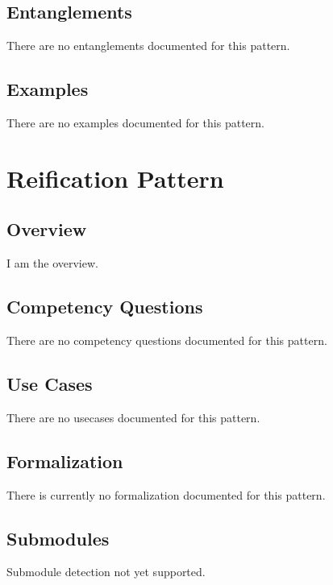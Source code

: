\subsection{Entanglements}
\label{ssec:entanglements}
There are no entanglements documented for this pattern.

\subsection{Examples}
\label{ssec:examples}
There are no examples documented for this pattern.


\section{Reification Pattern}
\label{sec:reification-pattern}
\subsection{Overview}
\label{ssec:overview}
I am the overview.

\subsection{Competency Questions}
\label{ssec:cqs}
There are no competency questions documented for this pattern.

\subsection{Use Cases}
\label{ssec:use-cases}
There are no usecases documented for this pattern.
\subsection{Formalization}
\label{ssec:formalization}
There is currently no formalization documented for this pattern.

\subsection{Submodules}
\label{ssec:submodules}
Submodule detection not yet supported.

